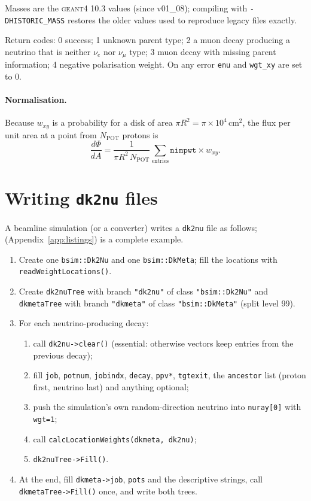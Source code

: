 \documentclass[11pt]{article}
\newcommand{\code}[1]{\texttt{#1}}
\newcommand{\geant}{\textsc{geant}\xspace}
\newcommand{\dktwonu}{\texttt{dk2nu}\xspace}
\newcommand{\app}[1]{Appendix~\ref{app:#1}}
\begin{document}
Masses are the \geant{}4 10.3 values (since v01\_08); compiling with
\code{-DHISTORIC\_MASS} restores the older values used to reproduce legacy
files exactly.

Return codes: 0 success; 1 unknown parent type; 2 a muon decay producing
a neutrino that is neither $\nu_e$ nor $\nu_\mu$ type; 3 muon decay with
missing parent information; 4 negative polarisation weight.  On any error
\code{enu} and \code{wgt\_xy} are set to 0.

\paragraph{Normalisation.}  Because $w_{xy}$ is a probability for a disk of
area $\pi R^2 = \pi\times 10^4\,\mathrm{cm}^2$, the flux per unit area at a
point from $N_\mathrm{POT}$ protons is
\begin{equation}
  \frac{d\Phi}{dA} = \frac{1}{\pi R^2\,N_\mathrm{POT}}
      \sum_\text{entries} \code{nimpwt}\times w_{xy}.
\end{equation}

\section{Writing \dktwonu files}\label{sec:write}

A beamline simulation (or a converter) writes a \dktwonu file as follows;
 (\app{listings}) is a complete
example.
\begin{enumerate}
\item Create one \code{bsim::Dk2Nu} and one \code{bsim::DkMeta}; fill the
      locations with \code{readWeightLocations()}.
\item Create \code{dk2nuTree} with branch \code{"dk2nu"} of class
      \code{"bsim::Dk2Nu"} and \code{dkmetaTree} with branch
      \code{"dkmeta"} of class \code{"bsim::DkMeta"} (split level 99).
\item For each neutrino-producing decay:
  \begin{enumerate}[nosep]
  \item call \code{dk2nu->clear()} (essential: otherwise vectors keep
        entries from the previous decay);
  \item fill \code{job}, \code{potnum}, \code{jobindx}, \code{decay},
        \code{ppv*}, \code{tgtexit}, the \code{ancestor} list (proton
        first, neutrino last) and anything optional;
  \item push the simulation's own random-direction neutrino into
        \code{nuray[0]} with \code{wgt=1};
  \item call \code{calcLocationWeights(dkmeta, dk2nu)};
  \item \code{dk2nuTree->Fill()}.
  \end{enumerate}
\item At the end, fill \code{dkmeta->job}, \code{pots} and the
      descriptive strings, call \code{dkmetaTree->Fill()} once, and write
      both trees.
\end{enumerate}
\end{document}
